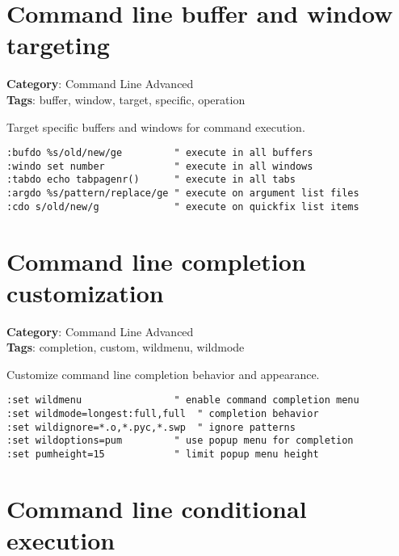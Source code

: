 {{{{\section{Command line buffer and window targeting}

\textbf{Category}: Command Line Advanced\\ \textbf{Tags}: buffer, window, target, specific, operation
\vspace{0.5cm}

Target specific buffers and windows for command execution.

\begin{Exa*}{}
\begin{Verbatim}[fontsize=\footnotesize, breaklines, breakanywhere]
:bufdo %s/old/new/ge         " execute in all buffers
:windo set number            " execute in all windows  
:tabdo echo tabpagenr()      " execute in all tabs
:argdo %s/pattern/replace/ge " execute on argument list files
:cdo s/old/new/g             " execute on quickfix list items
\end{Verbatim}
\end{Exa*}

\section{Command line completion customization}

\textbf{Category}: Command Line Advanced\\ \textbf{Tags}: completion, custom, wildmenu, wildmode
\vspace{0.5cm}

Customize command line completion behavior and appearance.

\begin{Exa*}{}
\begin{Verbatim}[fontsize=\footnotesize, breaklines, breakanywhere]
:set wildmenu                " enable command completion menu
:set wildmode=longest:full,full  " completion behavior
:set wildignore=*.o,*.pyc,*.swp  " ignore patterns
:set wildoptions=pum         " use popup menu for completion
:set pumheight=15            " limit popup menu height
\end{Verbatim}
\end{Exa*}

\section{Command line conditional execution}

}}}}
